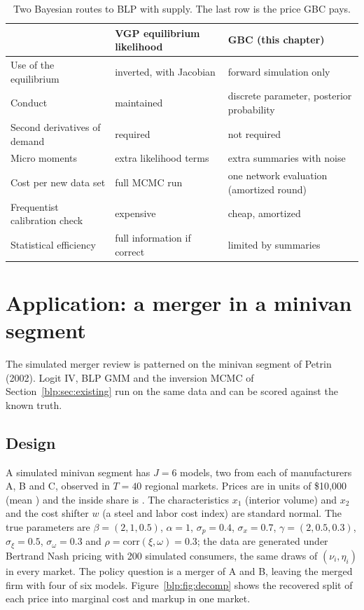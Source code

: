 \begin{table}[htbp]
\centering\footnotesize
\begin{tabular}{@{}L{1.2in}L{1.35in}L{1.5in}@{}}
\toprule
 & VGP equilibrium likelihood & GBC (this chapter) \\
\midrule
Use of the equilibrium & inverted, with Jacobian & forward simulation only \\
Conduct & maintained & discrete parameter, posterior probability \\
Second derivatives of demand & required & not required \\
Micro moments & extra likelihood terms & extra summaries with noise \\
Cost per new data set & full MCMC run & one network evaluation (amortized round) \\
Frequentist calibration check & expensive & cheap, amortized \\
Statistical efficiency & full information if correct & limited by summaries \\
\bottomrule
\end{tabular}
\caption{Two Bayesian routes to BLP with supply. The last row is the price GBC pays.}
\label{blp:tab:compare}
\end{table}

\section[A minivan merger]{Application: a merger in a minivan segment}\label{blp:sec:app}

The simulated merger review is patterned on the minivan segment of Petrin (2002). Logit IV, BLP GMM and the inversion MCMC of Section~\ref{blp:sec:existing} run on the same data and can be scored against the known truth.

\subsection{Design}
A simulated minivan segment has $J=6$ models, two from each of manufacturers A, B and C, observed in $T=40$ regional markets. Prices are in units of \$10{,}000 (mean \nummeanprice) and the inside share is
\numinsideshare. The characteristics $x_1$ (interior volume) and $x_2$ and the cost shifter $w$
(a steel and labor cost index) are standard normal. The true parameters are
$\beta = (2, 1, 0.5)$, $\alpha=1$, $\sigma_p = 0.4$, $\sigma_x=0.7$, $\gamma=(2,0.5,0.3)$,
$\sigma_\xi = 0.5$, $\sigma_\omega=0.3$ and $\rho = \mathrm{corr}(\xi,\omega)=0.3$; the data are
generated under Bertrand Nash pricing with 200 simulated consumers, the same draws of $(\nu_i,\eta_i)$ in every market. The policy question is a merger of A and B, leaving the merged firm with four of six models. Figure~\ref{blp:fig:decomp} shows the recovered split of each price into marginal cost and markup in one market.

